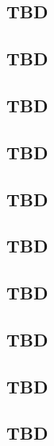 \subsection{TBD}
\subsection{TBD}
\subsection{TBD}
\subsection{TBD}
\subsection{TBD}
\subsection{TBD}
\subsection{TBD}
\subsection{TBD}
\subsection{TBD}
\subsection{TBD}